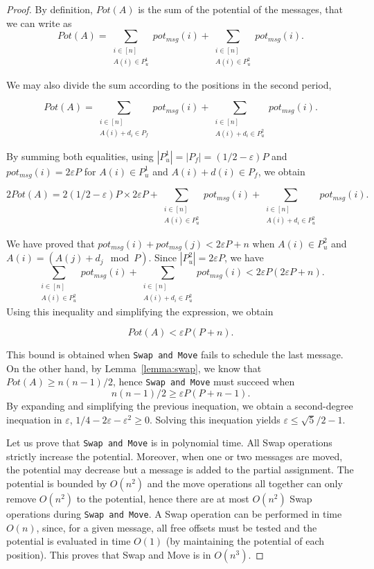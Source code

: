 \documentclass[a4paper,UKenglish,cleveref, autoref, thm-restate]{lipics-v2019}
\newcommand\swapandmove{\texttt{Swap and Move}\xspace}
\begin{document}
\begin{proof}
By definition, $Pot(A)$ is the sum of the potential of the messages, that we can write as 
$$Pot(A) = \sum_{\substack{i \in [n] \\ A(i) \in P^1_u} } pot_{msg}(i) + \sum_{\substack{i \in [n] \\ A(i) \in P^2_u} } pot_{msg}(i).$$

We may also divide the sum according to the positions in the second period,

$$Pot(A) = \sum_{\substack{i \in [n] \\ A(i) + d_i \in P_f} } pot_{msg}(i) + \sum_{\substack{i \in [n] \\ A(i) + d_i \in P^2_u} } pot_{msg}(i).$$

By summing both equalities, using $|P^1_u| = |P_f| = (1/2 - \varepsilon)P$ and 
$pot_{msg}(i) = 2\varepsilon P$ for $A(i) \in P^1_u$ and  $A(i) + d(i) \in P_f$, we obtain  


$$2Pot(A) = 2(1/2 - \varepsilon)P \times 2\varepsilon P + \sum_{\substack{i \in [n] \\ A(i) \in P^2_u} } pot_{msg}(i) + \sum_{\substack{i \in [n] \\ A(i) + d_i \in P^2_u} } pot_{msg}(i).$$


We have proved that $pot_{msg}(i) + pot_{msg}(j) < 2\varepsilon P + n$ when $A(i) \in P^2_u$ and $A(i) = (A(j) + d_j \mod P)$. Since  $|P^2_u| = 2\varepsilon P$, we have $$\sum_{\substack{i \in [n] \\ A(i) \in P^2_u} } pot_{msg}(i) + \sum_{\substack{i \in [n] \\ A(i) + d_i \in P^2_u} } pot_{msg}(i) < 2\varepsilon P(2\varepsilon P + n).$$
Using this inequality and simplifying the expression, we obtain 


$$  Pot(A) < \varepsilon P (P + n).$$

This bound is obtained when \swapandmove fails to schedule the last message.
On the other hand, by Lemma~\ref{lemma:swap}, we know that $Pot(A) \geq n(n-1)/2$, hence 
\swapandmove must succeed when
$$n(n-1)/2 \geq  \varepsilon P (P + n -1).$$
By expanding and simplifying the previous inequation, we obtain a second-degree inequation in $\varepsilon$, $1/4 - 2\varepsilon - \varepsilon ^2 \geq  0$.
Solving this inequation yields $\varepsilon \leq \sqrt{5}/2 -1$.


Let us prove that \swapandmove is in polynomial time. All Swap operations 
strictly increase the potential. Moreover, when one or two messages are moved, the potential may decrease but a message is added to the partial assignment. The potential is bounded by $O(n^2)$ and the move operations all together can only remove $O(n^2)$ to the potential, hence there are at most $O(n^2)$ Swap operations during \swapandmove. A Swap operation can be performed in time $O(n)$, since, for a given message, all free offsets must be tested and the potential is evaluated in time $O(1)$ (by maintaining the potential of each position). This proves that Swap and Move is in $O(n^3)$.  
\end{proof}
\end{document}
